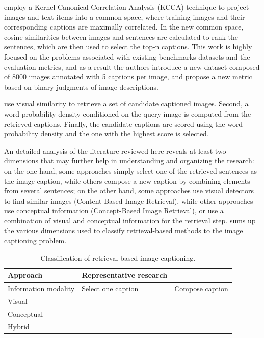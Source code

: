 \citet{Hodosh2013b} employ a Kernel Canonical Correlation Analysis (KCCA) \citep{Bach2003} technique to project images and text items into a common space, where training images and their corresponding captions are maximally correlated. In the new common space, cosine similarities between images and sentences are calculated to rank the sentences, which are then used to select the top-n captions. This work is highly focused on the problems associated with existing benchmarks datasets and the evaluation metrics, and as a result the authors introduce a new dataset composed of 8000 images annotated with 5 captions per image, and propose a new metric based on binary judgments of image descriptions.

\citet{Mason2015} use visual similarity to retrieve a set of candidate captioned images. Second, a word probability density conditioned on the query image is computed from the retrieved captions. Finally, the candidate captions are scored using the word probability density and the one with the highest score is selected. 

An detailed analysis of the literature reviewed here reveals at least two dimensions that may further help in understanding and organizing the research: on the one hand, some approaches simply select one of the retrieved sentences as the image caption, while others compose a new caption by combining elements from several sentences; on the other hand, some approaches use visual detectors to find similar images (Content-Based Image Retrieval), while other approaches use conceptual information (Concept-Based Image Retrieval), or use a combination of visual and conceptual information for the retrieval step.  sums up the various dimensions used to classify retrieval-based methods to the image captioning problem.

\begin{table}[ht]
\centering
\caption{Classification of retrieval-based image captioning.}
\begin{tabular}[t]{p{}p{}p{}}
    \toprule
    Approach & Representative research\\
    \midrule
    Information modality & Select one caption & Compose caption \\
    Visual & \citet{Farhadi2010, Mason2015} & \cite{Gupta2012} \\
    Conceptual &  \cite{Ordonez2011} & \citet{Kuznetsova2012, Kuznetsova2014} \\
    Hybrid &  \citet{Hodosh2013b} & \\
    \bottomrule
\end{tabular}
\label{tab:retrieval_classification}
\end{table}

